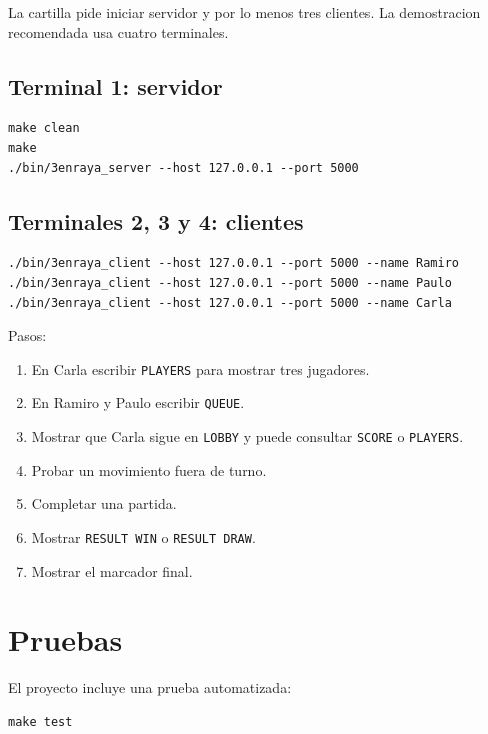 \documentclass[12pt,a4paper]{article}
\begin{document}
La cartilla pide iniciar servidor y por lo menos tres clientes. La demostracion
recomendada usa cuatro terminales.

\subsection{Terminal 1: servidor}

\begin{lstlisting}[style=code]
make clean
make
./bin/3enraya_server --host 127.0.0.1 --port 5000
\end{lstlisting}

\subsection{Terminales 2, 3 y 4: clientes}

\begin{lstlisting}[style=code]
./bin/3enraya_client --host 127.0.0.1 --port 5000 --name Ramiro
./bin/3enraya_client --host 127.0.0.1 --port 5000 --name Paulo
./bin/3enraya_client --host 127.0.0.1 --port 5000 --name Carla
\end{lstlisting}

Pasos:

\begin{enumerate}
    \item En Carla escribir \texttt{PLAYERS} para mostrar tres jugadores.
    \item En Ramiro y Paulo escribir \texttt{QUEUE}.
    \item Mostrar que Carla sigue en \texttt{LOBBY} y puede consultar
    \texttt{SCORE} o \texttt{PLAYERS}.
    \item Probar un movimiento fuera de turno.
    \item Completar una partida.
    \item Mostrar \texttt{RESULT WIN} o \texttt{RESULT DRAW}.
    \item Mostrar el marcador final.
\end{enumerate}

\section{Pruebas}

El proyecto incluye una prueba automatizada:

\begin{lstlisting}[style=code]
make test
\end{lstlisting}
\end{document}
